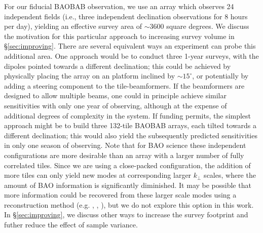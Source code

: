 \documentclass[10pt,iop]{emulateapj}
\begin{document}
For our fiducial BAOBAB observation, we use an array which observes 24 independent fields
(i.e., three independent declination observations for 8 hours per day), yielding an
effective survey area of $\sim 3600$ square degrees.  
We discuss the motivation for this particular approach to increasing survey volume in
\S\ref{sec:improving}.
There are several equivalent ways an 
experiment can probe this additional area.  One approach would be to conduct three 1-year surveys,
with the dipoles pointed towards a different declination; this could be achieved by physically
placing the array on an platform inclined by $\sim 15^{\circ}$, or potentially by adding a steering
component to the tile-beamformers.  If the beamformers are designed to allow multiple beams, one
could in principle achieve similar sensitivities with only one year of observing, although
at the expense of additional degrees of complexity in the system.  If funding permits, the 
simplest approach might be to build three 132-tile BAOBAB arrays, each tilted towards a different
declination; this would also yield the subsequently predicted sensitivities in only one season of
observing.  Note that for BAO science these independent configurations are more desirable than
an array with a larger number of fully correlated tiles.  Since we are using a close-packed
configuration, the addition of more tiles can only yield new modes at corresponding larger $k_{\perp}$
scales, where the amount of BAO information is significantly diminished.  It may be possible
that more information could be recovered from these larger scale modes using a reconstruction
method (e.g. \citealt{eisenstein_et_al_2007}, \citealt{padmanabhan_et_al_2009},
\citealt{noh_et_al_2009}), but we do not explore this option in this work.  In \S\ref{sec:improving},
we discuss other ways to increase the survey footprint and futher reduce the effect of sample
variance.
\end{document}
